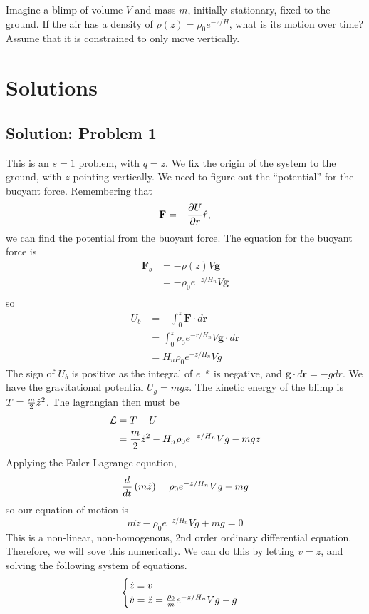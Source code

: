 \documentclass[titlepage]{article}
\begin{document}
Imagine a blimp of volume $V$ and mass $m$, initially stationary, fixed to the ground. If the air has a density of $\rho(z) = \rho_0 e^{-{z / H}} $, what is its motion over time? Assume that it is constrained to only move vertically.

\newpage

\section{Solutions}

\subsection{Solution: Problem 1}

This is an $s = 1$ problem, with $q = z$. We fix the origin of the system to the ground, with $z$ pointing vertically. We need to figure out the ``potential'' for the buoyant force. Remembering that
\[
    \textbf{F} = - {\partial U \over \partial r} \hat{r},
\]
we can find the potential from the buoyant force. The equation for the buoyant force is
\[
    \begin{split}
        \textbf{F}_b &= - \rho(z) V \textbf{g} \\
        &= - \rho_{0} e^{-z / H_{n}} V \textbf{g} \\
    \end{split}
\]
so
\[
    \begin{split}
        U_b &= - \int_0^z \textbf{F} \cdot d\textbf{r} \\
        &= \int_0^z \rho_{0} e^{-r / H_{n}} V \textbf{g} \cdot d\textbf{r} \\
        &= H_n \rho_0 e^{-z/H_n} V g
    \end{split}
\]
The sign of $U_b$ is positive as the integral of $e^{-x}$ is negative, and $\textbf{g} \cdot d\textbf{r} = -g dr$. We have the gravitational potential $U_g = mgz$. The kinetic energy of the blimp is $T = {m \over 2} \dot{z}^2$. The lagrangian then must be
\[
    \begin{split}
        \mathcal{L} &= T - U \\
        &= {m \over 2} \dot{z}^2 - H_n \rho_0 e^{-z/H_n} V g - mgz
    \end{split}
\]
Applying the Euler-Lagrange equation,
\[
    {d \over dt} \left( m\dot{z} \right) = \rho_0 e^{-z / H_n} V g - mg
\]
so our equation of motion is
\[
    m\ddot{z} - \rho_0 e^{-z / H_n} V g + mg = 0
\]
This is a non-linear, non-homogenous, 2nd order ordinary differential equation. Therefore, we will sove this numerically. We can do this by letting $v = \dot{z}$, and solving the following system of equations. 
\[
    \begin{cases}
        \dot{z} = v \\
        \dot{v} = \ddot{z} = {\rho_0 \over m} e^{-z / H_n} V g - g
    \end{cases}
\]
\end{document}
